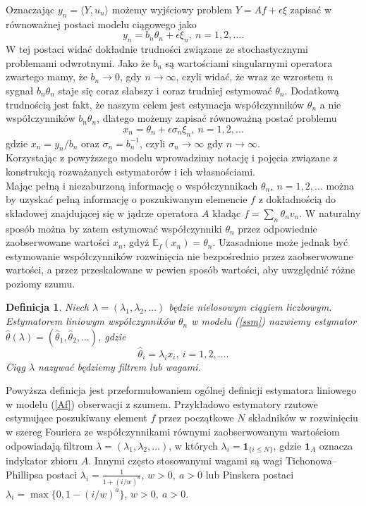 \documentclass[man,mfiu]{mgrwms}
\newtheorem{df}{Definicja}[chapter]
\begin{document}
Oznaczając $y_n=\langle Y,u_n\rangle$ możemy wyjściowy problem $Y=Af+\epsilon\xi$ zapisać w równoważnej postaci modelu ciągowego jako
\begin{displaymath}
y_n=b_n\theta_n+\epsilon\xi_n,\ n=1,2,\dots.
\end{displaymath}
W tej postaci widać dokładnie trudności związane ze stochastycznymi problemami odwrotnymi. Jako że $b_n$ są wartościami singularnymi operatora zwartego mamy, że $b_n\to 0$, gdy $n\to \infty$, czyli widać, że wraz ze wzrostem $n$ sygnał $b_n\theta_n$ staje się coraz słabszy i coraz trudniej estymować $\theta_n$. Dodatkową trudnością jest fakt, że naszym celem jest estymacja współczynników $\theta_n$ a nie współczynników $b_n\theta_n$, dlatego możemy zapisać równoważną postać problemu
\begin{equation}\label{ssm}
x_n=\theta_n+\epsilon\sigma_n\xi_n,\ n=1,2,\dots
\end{equation}
gdzie $x_n=y_n/b_n$ oraz $\sigma_n=b_n^{-1}$, czyli $\sigma_n\to \infty$ gdy $n\to \infty$. \\

Korzystając z powyższego modelu wprowadzimy notację i pojęcia związane z konstrukcją rozważanych estymatorów i ich własnościami.\\
Mając pełną i niezaburzoną informację o współczynnikach $\theta_n,\ n=1,2,\dots$ można by uzyskać pełną informację o poszukiwanym elemencie $f$ z dokładnością do składowej znajdującej się w jądrze operatora $A$ kładąc $f=\sum_n\theta_nv_n$. W naturalny sposób można by zatem estymować współczynniki $\theta_n$ przez odpowiednie zaobserwowane wartości $x_n$, gdyż $\mathbb{E}_f(x_n)=\theta_n$. Uzasadnione może jednak być estymowanie współczynników rozwinięcia nie bezpośrednio przez zaobserwowane wartości, a przez przeskalowane w pewien sposób wartości, aby uwzględnić różne poziomy szumu. 
\begin{df}
Niech $\lambda=(\lambda_1,\lambda_2,\dots)$ będzie nielosowym ciągiem liczbowym. Estymatorem liniowym współczynników $\theta_n$ w modelu (\ref{ssm}) nazwiemy estymator $\hat{\theta}(\lambda)=(\hat{\theta}_1,\hat{\theta}_2,\dots)$, gdzie
\begin{displaymath}
\hat{\theta}_i=\lambda_ix_i,\ i=1,2,\dots.
\end{displaymath}
Ciąg $\lambda$ nazywać będziemy filtrem lub wagami.
\end{df}
Powyższa definicja jest przeformułowaniem ogólnej definicji estymatora liniowego w modelu (\ref{Af}) obserwacji z szumem. 
Przykładowo estymatory rzutowe estymujące poszukiwany element $f$ przez początkowe $N$ składników w rozwinięciu w szereg Fouriera ze współczynnikami równymi zaobserwowanym wartościom odpowiadają filtrom $\lambda=(\lambda_1,\lambda_2,\dots)$, w których $\lambda_i=\pmb{1}_{\{i\leq N\}}$, gdzie $\pmb{1}_A$ oznacza indykator zbioru $A$. Innymi często stosowanymi wagami są wagi Tichonowa-- Phillipsa postaci $\lambda_i=\frac{1}{1+(i/w)^a}$, $w>0,\ a>0$ lub Pinskera postaci $\lambda_i=\max\{0,1-(i/w)^a\}$, $w>0,\ a>0$. \\
\end{document}
